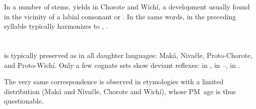 In a number of stems,  yields  in Chorote and Wichí, a development usually found in the vicinity of a labial consonant or . In the same words,  in the preceding syllable typically harmonizes to , .

\begin{exe}
    \ex \flower
    \ex \najendup
    \ex \shoulder
    \ex \shoulderblade
    \ex \abdcavity
    \ex \paloflojof
    \ex \spring
\end{exe}

\section{}\label{pm-o}
 is typically preserved as  in all daughter languages: Maká, Nivaĉle, Proto-Chorote, and Proto-Wichí. Only a few cognate sets show deviant reflexes:  in ,  in --,  in .

\begin{exe}
    \ex \coal
    \ex \elbow
    \ex \hand \label{o-hand}
    \ex \roundkoy
    \ex \armadillo
    \ex \bottomn
    \ex \ashes
    \ex \winter
    \ex \iscayante
    \ex \many
    \ex \roast
    \ex \savannahhawk
    \ex \zorzal
    \ex \wildmanioc \label{o-wildmanioc}
    \ex \penis
    \ex \seed
    \ex \deep
    \ex \full
    \ex \fillv
    \ex \cover
    \ex \fence
    \ex \lid
    \ex \durmili
    \ex \face
    \ex \eyebrow
    \ex \snake
    \ex \far
    \ex \uncle
    \ex \aunt
    \ex \tsofa
    \ex \tsofatajf
    \ex \tsofatajt
    \ex \dov
    \ex \worm
    \ex \throwv \label{o-throw}
    \ex \whiteegret
    \ex \cardinal
    \ex \blackalgarrobof \label{o-blackalgarrobof}
    \ex \blackalgarrobot \label{o-blackalgarrobot}
    \ex \expert
    \ex \neck
    \ex \blood
    \ex \butterfly
    \ex \gov
    \ex \palosanto
    \ex \nightnw
    \ex \sandyplace
    \ex \pigeon
    \ex \extinguished
    \ex \bro
    \ex \hiccup
    \ex \chest
\end{exe}

The very same correspondence is observed in etymologies with a limited distribution (Maká and Nivaĉle, Chorote and Wichí), whose PM~age is thus questionable.

\begin{exe}
    \ex \throwpush
    \ex \arrowfok
    \ex \mancw
    \ex \heavyv
    \ex \locustcw
    \ex \hole
    \ex \cheek
    \ex \earcw
    \ex \heel
    \ex \noden
    \ex \utensil
    \ex \redbrocket
    \ex \wolf
    \ex \balawasp
    \ex \leafhaircw
    \ex \fox
    \ex \palocruzmn
    \ex \paralytic
    \ex \yawn
    \ex \ripe
    \ex \queenpalmf
    \ex \heartcw
\end{exe}

